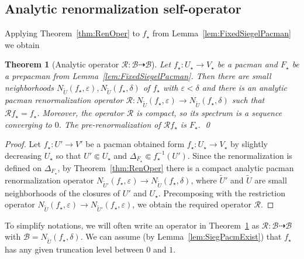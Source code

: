 \documentclass[]{amsart}
\newcommand{\bDelta}{{\mathbb{\Delta}}}
\newcommand\RR{\mathcal{R}}
\newcommand{\str}{{\star}}
\newcommand\BB{\mathcal{B}}
\newtheorem{thm}{Theorem}[section]
\theoremstyle{remark}
\numberwithin{equation}{section}
\theoremstyle{definition}
\begin{document}
\subsection{Analytic renormalization self-operator} 
 Applying Theorem~\ref{thm:RenOper} to $f_\str$ from Lemma~\ref{lem:FixedSiegelPacman} we obtain 
\begin{thm}[Analytic operator $\RR\colon \BB\dashrightarrow \BB$]
\label{thm: An Pacm  self ope}
Let $f_\str\colon U_\str\to V_\str$ be a pacman and $F_\str$ be a prepacman from Lemma~\ref{lem:FixedSiegelPacman}. Then there are small neighborhoods $N_{\widetilde U}(f_\str,\varepsilon), N_{\widetilde U}(f_\str,\delta)$ of $f_\str$ with $\varepsilon<\delta$ and there is an analytic pacman renormalization operator $\RR\colon N_{\widetilde U}(f_\str,\varepsilon)\to N_{\widetilde U}(f_\str,\delta)$ such that $\RR f_\str =f_\str$. Moreover, the operator $\RR$ is compact, so its spectrum is a sequence converging to $0$. The pre-renormalization of $\RR f_\str$ is $F_\str$.
\qed
\end{thm}
\begin{proof}
Let $f_\str\colon U'\to V'$ be a pacman obtained form $f_\str\colon U_\str\to V_\str$ by slightly decreasing $U_\str$ so that $U'\Subset U_\str$ and $\bDelta_{F_\str}\Subset  f_\str^{-1}(U')$. Since the renormalization is defined on $\bDelta_{F_\str}$, by Theorem~\ref{thm:RenOper} there is a compact analytic pacman renormalization operator $N_{\widetilde U'}(f_\str,\varepsilon)\to N_{\widetilde U}(f_\str,\delta)$, where $\widetilde U'$ and $\widetilde U$ are small neighborhoods of the closures of $U'$ and $U_\str$. Precomposing with the restriction operator $N_{\widetilde U}(f_\str,\varepsilon)\to N_{\widetilde U'}(f_\str,\varepsilon)$, we obtain the required operator $\RR$.
\end{proof}

 To simplify notations, we will often write an operator in Theorem~\ref{thm: An Pacm  self ope} as $\RR\colon \BB\dashrightarrow \BB$ with $\BB=N_{\widetilde U}(f_\str,\delta)$. We can assume (by Lemma~\ref{lem:SiegPacmExist}) that $f_\str$ has any given truncation level between $0$ and $1$.
\end{document}
